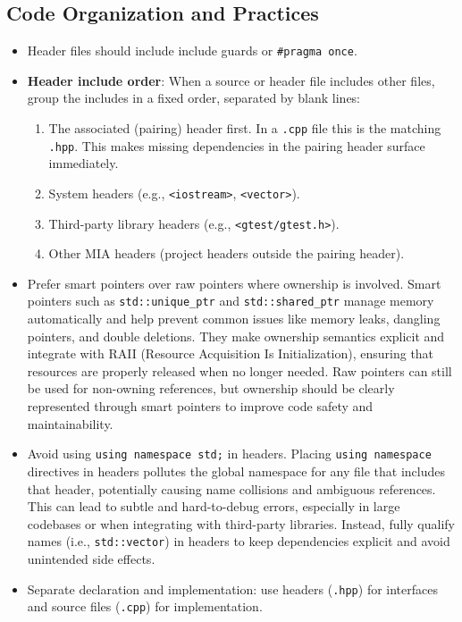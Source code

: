 \subsection{Code Organization and Practices}
\begin{itemize}\itemsep0em
    \item Header files should include include guards or \texttt{\#pragma once}.
    \item \textbf{Header include order}: When a source or header file includes other files, group the includes in a fixed order, separated by blank lines:
        \begin{enumerate}\itemsep0em
        \item The associated (pairing) header first. In a \texttt{.cpp} file this is the matching \texttt{.hpp}. This makes missing dependencies in the pairing header surface immediately.
        \item System headers (e.g., \texttt{<iostream>}, \texttt{<vector>}).
        \item Third-party library headers (e.g., \texttt{<gtest/gtest.h>}).
        \item Other MIA headers (project headers outside the pairing header).
        \end{enumerate}
    \item Prefer smart pointers over raw pointers where ownership is involved. Smart pointers such as \texttt{std::unique\_ptr} and \texttt{std::shared\_ptr} manage memory automatically and help prevent common issues like memory leaks, dangling pointers, and double deletions. They make ownership semantics explicit and integrate with RAII (Resource Acquisition Is Initialization), ensuring that resources are properly released when no longer needed. Raw pointers can still be used for non-owning references, but ownership should be clearly represented through smart pointers to improve code safety and maintainability.    
    \item Avoid using \texttt{using namespace std;} in headers. Placing \texttt{using namespace} directives in headers pollutes the global namespace for any file that includes that header, potentially causing name collisions and ambiguous references. This can lead to subtle and hard-to-debug errors, especially in large codebases or when integrating with third-party libraries. Instead, fully qualify names (i.e., \texttt{std::vector}) in headers to keep dependencies explicit and avoid unintended side effects.
    \item Separate declaration and implementation: use headers (\texttt{.hpp}) for interfaces and source files (\texttt{.cpp}) for implementation.

\end{itemize}
